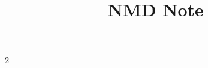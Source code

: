 \documentclass{note}
\title{NMD Note}
\author{}
\begin{document}
\maketitle

\begin{multicols}{2}
    
    \fbox{\parbox{\linewidth}{

    \section{}
    
    }}

    \columnbreak

    \fbox{\parbox{\linewidth}{

    \section{}
    
    }}


\end{multicols}
\end{document}
